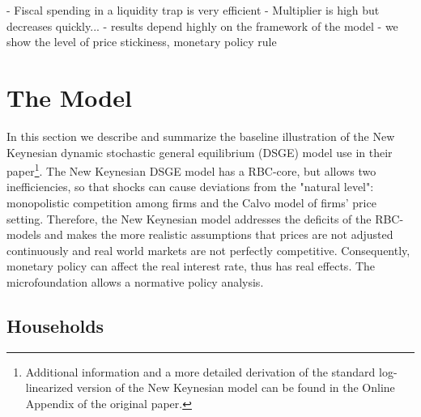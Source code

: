 \documentclass[12pt,a4paper,oneside,titlepage]{article}
\begin{document}
  - Fiscal spending in a liquidity trap is very efficient
  - Multiplier is high but decreases quickly...
  - results depend highly on the framework of the model - we show the level of price stickiness, monetary policy rule

\section{The Model}
In this section we describe and summarize the baseline illustration of the New Keynesian dynamic stochastic general equilibrium (DSGE) model \citet{Erceg.2014} use in their paper\footnote {Additional information and a more detailed derivation of the standard log-linearized version of the New Keynesian model can be found in the Online Appendix of the original paper.}. The New Keynesian DSGE model has a RBC-core, but allows two inefficiencies, so that shocks can cause deviations from the "natural level": monopolistic competition among firms and the Calvo model of firms' price setting. Therefore, the New Keynesian model addresses the deficits of the RBC-models and makes the more realistic assumptions that prices are not adjusted continuously and real world markets are not perfectly competitive. Consequently, monetary policy can affect the real interest rate, thus has real effects. The microfoundation allows a normative policy analysis.
\subsection*{Households}
\end{document}
